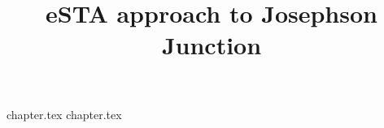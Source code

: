 \documentclass{article}
\title{eSTA approach to Josephson Junction}
\date{}
\author{}
\begin{document}

\maketitle

{chapter.tex}
{chapter.tex}
%
%

\end{document}
